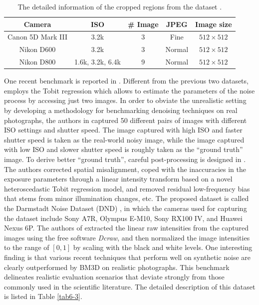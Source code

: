 \begin{table}[t!]
\caption{The detailed information of the cropped regions from the dataset \cite{crosschannel2016}.}
\label{tab6-2}
\begin{center}
\small
\renewcommand\arraystretch{1.2}
\begin{tabular*}{1\textwidth}{@{\extracolsep{\fill}}ccccc}
\hline
Camera
& 
ISO
&
\# Image
&
JPEG
&
Image size
\\
\hline
Canon 5D Mark III & 3.2k  & 3  & Fine & $512\times512$
\\
\hline
Nikon D600 & 3.2k & 3  & Normal & $512\times512$
\\
\hline   
Nikon D800 & 1.6k, 3.2k, 6.4k & 9  & Normal & $512\times512$
\\
\hline
\end{tabular*}
\end{center}
\vspace{-4mm}
\end{table}

One recent benchmark is reported in \cite{dnd2017}. Different from the previous two datasets, \cite{dnd2017} employs the Tobit regression which allows to estimate the parameters of the noise process by accessing just two images. In order to obviate the unrealistic setting by developing a methodology for benchmarking denoising techniques on real photographs, the authors in \cite{dnd2017} captured 50 different pairs of images with different ISO settings and shutter speed. The image captured with high ISO and faster shutter speed is taken as the real-world noisy image, while the image captured with low ISO and slower shutter speed is roughly taken as the ``ground truth'' image. To derive better ``ground truth'', careful post-processing is designed in \cite{dnd2017}. The authors corrected spatial misalignment, coped with the inaccuracies in the exposure parameters through a linear intensity transform based on a novel heteroscedastic Tobit regression model, and removed residual low-frequency bias that stems from minor illumination changes, etc. The proposed dataset is called the Darmstadt Noise Dataset (DND) \cite{dnd2017}, in which the cameras used for capturing the dataset include Sony A7R, Olympus E-M10, Sony RX100 IV, and Huawei Nexus 6P. The authors of \cite{dnd2017} extracted the linear raw intensities from the captured images using the free software \textsl{Dcraw}, and then normalized the image intensities to the range of $[0, 1]$ by scaling with the black and white levels. One interesting finding is that various recent techniques that perform well on synthetic noise are clearly outperformed by BM3D \cite{bm3d} on realistic photographs. This benchmark delineates realistic evaluation scenarios that deviate strongly from those commonly used in the scientific literature. The detailed description of this dataset is listed in Table \ref{tab6-3}.


